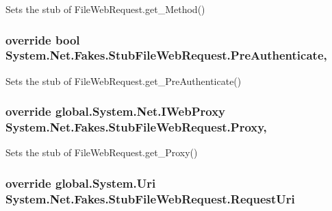Sets the stub of File\-Web\-Request.\-get\-\_\-\-Method()

\hypertarget{class_system_1_1_net_1_1_fakes_1_1_stub_file_web_request_ae3397bf1478ee278d848a7bd88c8c11a}{
\subsubsection[{Pre\-Authenticate}]{\setlength{\rightskip}{0pt plus 5cm}override bool System.\-Net.\-Fakes.\-Stub\-File\-Web\-Request.\-Pre\-Authenticate\hspace{0.3cm}{\ttfamily [get]}, {\ttfamily [set]}}}\label{class_system_1_1_net_1_1_fakes_1_1_stub_file_web_request_ae3397bf1478ee278d848a7bd88c8c11a}


Sets the stub of File\-Web\-Request.\-get\-\_\-\-Pre\-Authenticate()

\hypertarget{class_system_1_1_net_1_1_fakes_1_1_stub_file_web_request_a089f51a9610862989e4e08e6c76f996b}{
\subsubsection[{Proxy}]{\setlength{\rightskip}{0pt plus 5cm}override global.\-System.\-Net.\-I\-Web\-Proxy System.\-Net.\-Fakes.\-Stub\-File\-Web\-Request.\-Proxy\hspace{0.3cm}{\ttfamily [get]}, {\ttfamily [set]}}}\label{class_system_1_1_net_1_1_fakes_1_1_stub_file_web_request_a089f51a9610862989e4e08e6c76f996b}


Sets the stub of File\-Web\-Request.\-get\-\_\-\-Proxy()

\hypertarget{class_system_1_1_net_1_1_fakes_1_1_stub_file_web_request_a2d71be5a0c17cd1d903d177897a880d8}{
\subsubsection[{Request\-Uri}]{\setlength{\rightskip}{0pt plus 5cm}override global.\-System.\-Uri System.\-Net.\-Fakes.\-Stub\-File\-Web\-Request.\-Request\-Uri\hspace{0.3cm}{\ttfamily [get]}}}\label{class_system_1_1_net_1_1_fakes_1_1_stub_file_web_request_a2d71be5a0c17cd1d903d177897a880d8}


